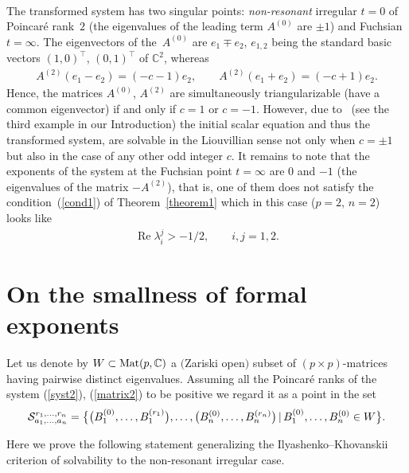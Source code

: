 \begin{Example}
\begin{gather*}
\end{gather*}
The transformed system has two singular points: {\it non-resonant} irregular $t=0$ of Poincar\'e rank~$2$ (the eigenvalues of the leading term $A^{(0)}$ are $\pm1$) and Fuchsian $t=\infty$. The eigenvectors of the~$A^{(0)}$ are $e_1\mp e_2$, $e_{1,2}$ being the standard basic vectors $(1,0)^{\top}$, $(0,1)^{\top}$ of ${\mathbb C}^2$, whereas
\begin{gather*}
A^{(2)}(e_1-e_2)=(-c-1)e_2, \qquad A^{(2)}(e_1+e_2)=(-c+1)e_2.
\end{gather*}
Hence, the matrices $A^{(0)}$, $A^{(2)}$ are simultaneously triangularizable (have a common eigenvector) if and only if $c=1$ or $c=-1$. However, due to~\cite{MMN} (see the third example in our Introduction) the initial scalar equation and thus the transformed system, are solvable in the Liouvillian sense not only when $c=\pm1$ but also in the case of any other odd integer $c$. It remains to note that the exponents of the system at the Fuchsian point $t=\infty$ are $0$ and $-1$ (the eigenvalues of the matrix $-A^{(2)}$), that is, one of them does not satisfy the condition~(\ref{cond1}) of Theorem~\ref{theorem1} which in this case ($p=2$, $n=2$) looks like
\begin{gather*}
\operatorname{Re}\lambda_i^j>-1/2, \qquad i,j=1,2.
\end{gather*}
\end{Example}

\section{On the smallness of formal exponents}\label{section3}

Let us denote by $W\subset{\rm Mat}(p,{\mathbb C})$ a $($Zariski open$)$ subset of $(p\times p)$-matrices having pairwise
distinct eigenvalues. Assuming all the Poincar\'e ranks of the system (\ref{syst2}), (\ref{matrix2}) to be positive we regard it as a point in the set
\begin{gather*}
{\cal S}_{a_1,\ldots,a_n}^{r_1,\ldots,r_n}=\bigl\{ \big(B^{(0)}_1,\ldots,B^{(r_1)}_1\big),\ldots,\big(B^{(0)}_n,\ldots,B^{(r_n)}_n\big) \,|\, B^{(0)}_1,\ldots,B^{(0)}_n \in W \bigr\}.
\end{gather*}

Here we prove the following statement generalizing the Ilyashenko--Khovanskii criterion of solvability to the non-resonant
irregular case.

